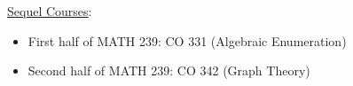 \underline{Sequel Courses}:
\begin{itemize}
    \item First half of MATH 239: CO 331 (Algebraic Enumeration)
    \item Second half of MATH 239: CO 342 (Graph Theory)
\end{itemize}
